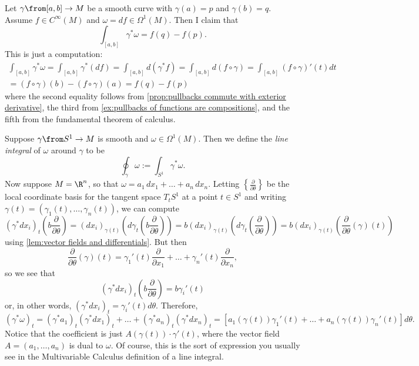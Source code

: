 \begin{example}\label{ex:integrating along a curve}
	Let $\gamma \from [a,b] \to M$ be a smooth curve with $\gamma(a) = p$ and $\gamma(b) = q$. Assume $f \in C^\infty(M)$ and $\omega = df \in \Omega^1(M)$. Then I claim that
	\[
		\int_{[a,b]} \gamma^\ast \omega = f(q) - f(p).
	\]
	This is just a computation:
	\begin{multline*}
		\int_{[a,b]} \gamma^\ast \omega = \int_{[a,b]}\gamma^\ast(df) = \int_{[a,b]} d (\gamma^\ast f) = \int_{[a,b]} d(f \circ \gamma) = \int_{[a,b]}(f \circ \gamma)'(t)dt \\
		= (f \circ \gamma)(b) - (f\circ \gamma)(a) = f(q)-f(p)
	\end{multline*}
	where the second equality follows from \cref{prop:pullbacks commute with exterior derivative}, the third from \cref{ex:pullbacks of functions are compositions}, and the fifth from the fundamental theorem of calculus.
\end{example}

\begin{example}\label{ex:line integral}
	Suppose $\gamma \from S^1 \to M$ is smooth and $\omega \in \Omega^1(M)$. Then we define the \emph{line integral} of $\omega$ around $\gamma$ to be
	\[
		\oint_\gamma \omega := \int_{S^1} \gamma^\ast \omega.
	\]
	Now suppose $M = \R^n$, so that $\omega = a_1 \, dx_1 + \dots + a_n \, dx_n$. Letting $\left\{\frac{\partial}{\partial \theta}\right\}$ be the local coordinate basis for the tangent space $T_t S^1$ at a point $t \in S^1$ and writing $\gamma(t) = (\gamma_1(t), \dots , \gamma_n(t))$, we can compute
	\[
		(\gamma^\ast dx_i)_t \left(b \frac{\partial}{\partial \theta} \right) = (dx_i)_{\gamma(t)} \left(d\gamma_t\left(b \frac{\partial}{\partial \theta}\right)\right) = b (dx_i)_{\gamma(t)} \left(d\gamma_t\left(\frac{\partial}{\partial \theta}\right)\right) = b (dx_i)_{\gamma(t)} \left(\frac{\partial}{\partial \theta}(\gamma)(t)\right) 
	\]
	using \cref{lem:vector fields and differentials}. But then
	\[
		\frac{\partial}{\partial \theta}(\gamma)(t) = \gamma_1'(t) \frac{\partial}{\partial x_1} + \dots + \gamma_n'(t) \frac{\partial}{\partial x_n},
	\]
	so we see that 
	\[
		(\gamma^\ast dx_i)_t \left(b \frac{\partial}{\partial \theta} \right) = b \gamma_i'(t)
	\]
	or, in other words, $(\gamma^\ast dx_i)_t = \gamma_i'(t)d\theta$. Therefore,
	\[
		(\gamma^\ast \omega)_t = (\gamma^\ast a_1)_t (\gamma^\ast dx_1)_t + \dots + (\gamma^\ast a_n)_t (\gamma^\ast dx_n)_t = \left[a_1(\gamma(t)) \gamma_1'(t) + \dots + a_n(\gamma(t))\gamma_n'(t)\right] d\theta.
	\]
	Notice that the coefficient is just $A(\gamma(t))\cdot \gamma'(t)$, where the vector field $A = (a_1, \dots , a_n)$ is dual to $\omega$. Of course, this is the sort of expression you usually see in the Multivariable Calculus definition of a line integral.
\end{example}

